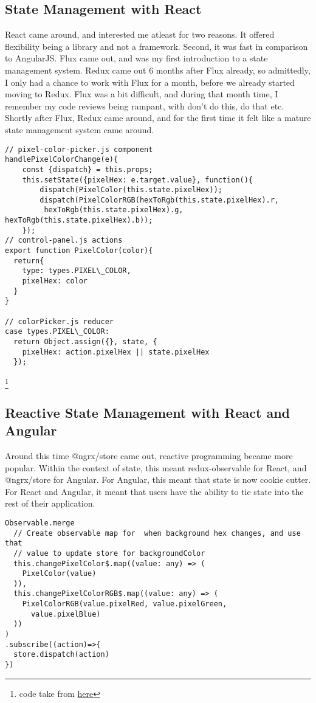 \subsection{ State Management with React }
React came around, and interested me atleast for two reasons. It offered
flexibility being a library and not a framework. Second, it was fast in
comparison to AngularJS. Flux came out, and was my first introduction to a
state management system. Redux came out 6 months after Flux already, so
admittedly, I only had a chance to work with Flux for a month, before we already
started moving to Redux. Flux was a bit difficult, and during that month time,
I remember my code reviews being rampant, with don't do this, do that etc.
Shortly after Flux, Redux came around, and for the first time it felt like a
mature state management system came around.

\begin{lstlisting}
// pixel-color-picker.js component
handlePixelColorChange(e){
    const {dispatch} = this.props;
    this.setState({pixelHex: e.target.value}, function(){
        dispatch(PixelColor(this.state.pixelHex));
        dispatch(PixelColorRGB(hexToRgb(this.state.pixelHex).r,
         hexToRgb(this.state.pixelHex).g, hexToRgb(this.state.pixelHex).b));
    });
// control-panel.js actions
export function PixelColor(color){
  return{
    type: types.PIXEL\_COLOR,
    pixelHex: color
  }
}

// colorPicker.js reducer
case types.PIXEL\_COLOR:
  return Object.assign({}, state, {
    pixelHex: action.pixelHex || state.pixelHex
  });
\end{lstlisting}
\footnote{code take from \href{https://github.com/CharlieGreenman/pixelLight}{here}}

\subsection{ Reactive State Management with React and Angular }
Around this time @ngrx/store came out, reactive programming became more popular.
Within the context of state, this meant redux-observable for React, and
@ngrx/store for Angular. For Angular, this meant that state is now cookie
cutter. For React and Angular, it meant that users have the ability to tie state into the
rest of their application.

\begin{lstlisting}
Observable.merge
  // Create observable map for  when background hex changes, and use that
  // value to update store for backgroundColor
  this.changePixelColor$.map((value: any) => (
    PixelColor(value)
  )),
  this.changePixelColorRGB$.map((value: any) => (
    PixelColorRGB(value.pixelRed, value.pixelGreen,
      value.pixelBlue)
  ))
)
.subscribe((action)=>{
  store.dispatch(action)
})
\end{lstlisting}

